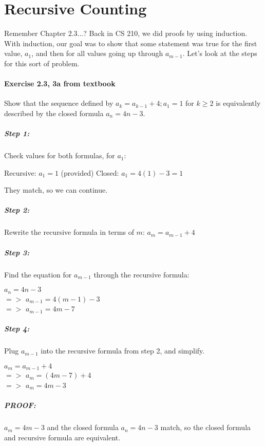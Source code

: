 
\newcommand{\laClass}       {CS 211}
\newcommand{\laSemester}    {Spring 2018}
\newcommand{\laChapter}     {5.5}
\newcommand{\laType}        {Exercise}
\newcommand{\laPoints}      {5}
\newcommand{\laTitle}       {Recursive Counting}
\newcommand{\laDate}        {Jan 16, 2018}
\setcounter{chapter}{5}
\setcounter{section}{5}
\addtocounter{section}{-1}

\toggletrue{answerkey}
\togglefalse{answerkey}





    \section{\laTitle}

    \begin{intro}{Remember Chapter 2.3...?}
        \small 
        Back in CS 210, we did proofs by using induction. With induction,
        our goal was to show that some statement was true for the first
        value, $a_{1}$, and then for all values going up through $a_{m-1}$.
        Let's look at the steps for this sort of problem.
        
        \paragraph{Exercise 2.3, 3a from textbook}
        Show that the sequence defined by $a_{k} = a_{k-1} + 4; a_{1} = 1$ for
        $k \geq 2$ is equivalently described by the closed formula $a_{n} = 4n-3$.

        \subparagraph{Step 1:} Check values for both formulas, for $a_{1}$:

            \tab Recursive: $a_{1} = 1$ (provided)
            \tab Closed: $a_{1} = 4(1) - 3 = 1$

            They match, so we can continue.

        \subparagraph{Step 2:} Rewrite the recursive formula in terms of $m$:
            $a_{m} = a_{m-1} + 4$

        \subparagraph{Step 3:} Find the equation for $a_{m-1}$ through the recursive formula:

            \tab $a_{n} = 4n - 3$ \\
            \tab $=>$ $a_{m-1} = 4(m-1) - 3$ \\
            \tab $=>$ $a_{m-1} = 4m - 7$

        \subparagraph{Step 4:} Plug $a_{m-1}$ into the recursive formula from step 2, and simplify.

            \tab $a_{m} = a_{m-1} + 4$ \\
            \tab $=>$   $a_{m} = (4m-7) + 4$ \\
            \tab $=>$   $a_{m} = 4m - 3$

        \subparagraph{PROOF:} $a_{m} = 4m-3$ and the closed formula $a_{n} = 4n-3$ match,
            so the closed formula and recursive formula are equivalent.

    \end{intro}

